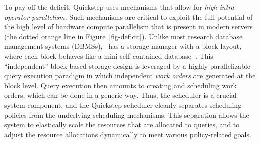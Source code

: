 To pay off the deficit, Quickstep
uses mechanisms that allow for \textit{high intra-operator parallelism}. Such mechanisms are critical to exploit the full potential of the high level of hardware compute parallelism that is present in modern servers (the dotted orange line in Figure~\ref{fig-deficit}).
Unlike most research database management systems (DBMSs), \Quickstep\ has a storage manager with a block layout, where each block behaves like a mini self-contained database~\cite{ChasseurP13}.
This ``independent'' block-based storage design is leveraged by a highly parallelizable query execution paradigm in which independent \textit{work orders} are generated at the block level. Query execution then amounts to creating and scheduling work orders, which can be done in a generic way. Thus, the scheduler is a crucial system component, and the Quickstep scheduler cleanly separates scheduling policies from the underlying scheduling mechanisms. This separation allows the system to elastically scale the resources that are allocated to queries, and to adjust the resource allocations dynamically to meet various policy-related goals.



